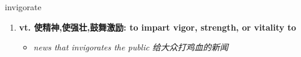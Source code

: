 
\begin{frame}
{\huge invigorate}
\begin{center}
\begin{enumerate}\Large
  \item \textbf{vt. 使精神,使强壮,鼓舞激励: to impart vigor, strength, or vitality to}
  \begin{itemize}
    \item \em{\Large{news that invigorates the public 给大众打鸡血的新闻}}
  \end{itemize}
\end{enumerate}
\end{center}
\end{frame}
